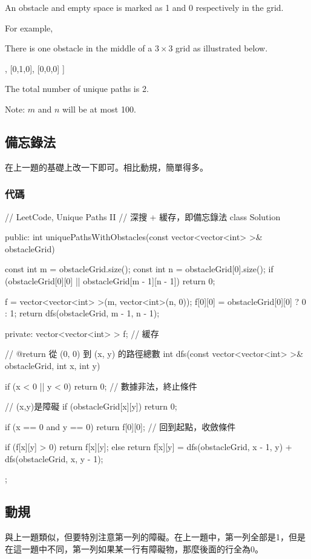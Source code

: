 An obstacle and empty space is marked as 1 and 0 respectively in the grid.

For example,

There is one obstacle in the middle of a $3 \times 3$ grid as illustrated below.
\begin{Code}
[
  [0,0,0],
  [0,1,0],
  [0,0,0]
]
\end{Code}

The total number of unique paths is 2.

Note: $m$ and $n$ will be at most 100.


\subsection{備忘錄法}
在上一題的基礎上改一下即可。相比動規，簡單得多。

\subsubsection{代碼}
\begin{Code}
// LeetCode, Unique Paths II
// 深搜 + 緩存，即備忘錄法
class Solution {
public:
    int uniquePathsWithObstacles(const vector<vector<int> >& obstacleGrid) {
        const int m = obstacleGrid.size();
        const int n = obstacleGrid[0].size();
        if (obstacleGrid[0][0] || obstacleGrid[m - 1][n - 1]) return 0;

        f = vector<vector<int> >(m, vector<int>(n, 0));
        f[0][0] = obstacleGrid[0][0] ? 0 : 1;
        return dfs(obstacleGrid, m - 1, n - 1);
    }
private:
    vector<vector<int> > f;  // 緩存

    // @return 從 (0, 0) 到 (x, y) 的路徑總數
    int dfs(const vector<vector<int> >& obstacleGrid,
            int x, int y) {
        if (x < 0 || y < 0) return 0; // 數據非法，終止條件

        // (x,y)是障礙
        if (obstacleGrid[x][y]) return 0;

        if (x == 0 and y == 0) return f[0][0]; // 回到起點，收斂條件

        if (f[x][y] > 0) {
            return f[x][y];
        } else {
            return f[x][y] = dfs(obstacleGrid, x - 1, y) + 
                dfs(obstacleGrid, x, y - 1);
        }
    }
};
\end{Code}


\subsection{動規}
與上一題類似，但要特別注意第一列的障礙。在上一題中，第一列全部是1，但是在這一題中不同，第一列如果某一行有障礙物，那麼後面的行全為0。


